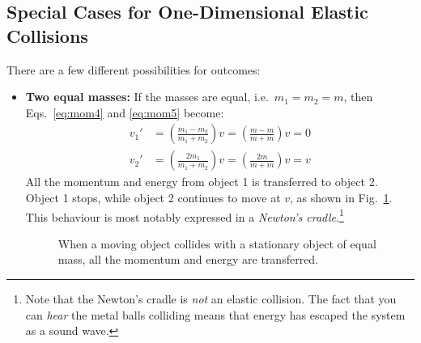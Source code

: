 \subsection{Special Cases for One-Dimensional Elastic Collisions}
There are a few different possibilities for outcomes:
\begin{itemize}[itemsep=6pt]
\item\textbf{Two equal masses:} If the masses are equal, i.e.\ $m_1=m_2=m$,
  then Eqs.~\ref{eq:mom4} and \ref{eq:mom5} become:
  \begin{align*}
    v_1'&=\left(\frac{m_1-m_2}{m_1+m_2}\right)v
    =\left(\frac{m-m}{m+m}\right)v=0\\
    v_2'&=\left(\frac{2m_1}{m_1+m_2}\right)v
    =\left(\frac{2m}{m+m}\right)v=v
  \end{align*}
  All the momentum and energy from object 1 is transferred to object 2. Object
  1 stops, while object 2 continues to move at $v$, as shown in
  Fig.~\ref{fig:same-mass}. This behaviour is most notably expressed in a
  \emph{Newton's cradle}.\footnote{Note that the Newton's cradle is \emph{not}
    an elastic collision. The fact that you can \emph{hear} the metal balls
    colliding means that energy has escaped the system as a sound wave.}
  \begin{figure}[ht]
    \centering
    \caption{When a moving object collides with a stationary object of equal
      mass, all the momentum and energy are transferred.}
    \label{fig:same-mass}
  \end{figure}
  

\end{itemize}

